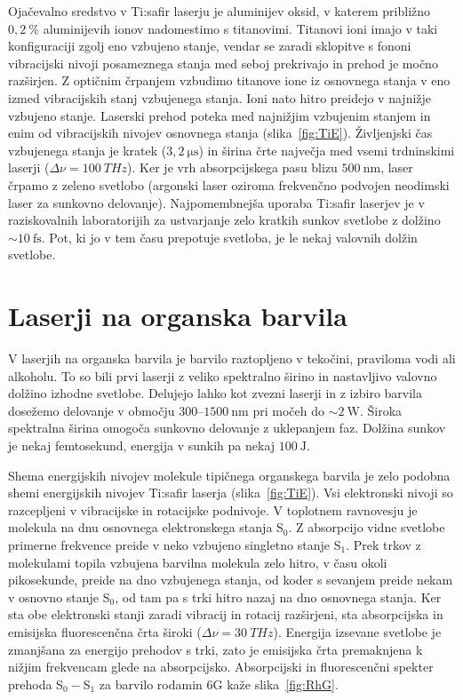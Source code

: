 Ojačevalno sredstvo v Ti:safir laserju je aluminijev oksid, v katerem 
približno $0,2~\%$ aluminijevih ionov nadomestimo s titanovimi. Titanovi ioni imajo 
v taki konfiguraciji zgolj eno vzbujeno stanje, vendar se zaradi sklopitve s fononi
vibracijski nivoji posameznega stanja med seboj prekrivajo in prehod je močno razširjen. 
Z optičnim črpanjem vzbudimo titanove ione iz osnovnega stanja v eno izmed vibracijskih 
stanj vzbujenega stanja. Ioni nato hitro preidejo v najnižje vzbujeno stanje. 
Laserski prehod poteka med najnižjim vzbujenim stanjem in enim od vibracijskih 
nivojev osnovnega stanja (slika~\ref{fig:TiE}). Življenjski čas
vzbujenega stanja je kratek ($3,2~\si{\micro\second}$) in širina črte največja med
vsemi trdninskimi laserji ($\Delta \nu =  100~\si{THz}$). 
Ker je vrh absorpcijskega pasu blizu $500~\si{\nano\metre}$,
laser črpamo z zeleno svetlobo (argonski laser oziroma
frekvenčno podvojen neodimski laser za sunkovno delovanje). 
Najpomembnejša uporaba Ti:safir laserjev je v raziskovalnih laboratorijih za ustvarjanje zelo 
kratkih sunkov svetlobe z dolžino $\sim 10~\si{\femto\second}$. Pot, ki jo 
v tem času prepotuje svetloba, je le nekaj valovnih dolžin svetlobe. 

\section{Laserji na organska barvila}
V laserjih na organska barvila je barvilo raztopljeno v tekočini, praviloma vodi ali alkoholu. 
To so bili prvi laserji z veliko spektralno širino in nastavljivo valovno dolžino
izhodne svetlobe. Delujejo lahko kot zvezni laserji in z izbiro barvila dosežemo
delovanje v območju $300$--$1500~\si{\nano\metre}$ pri močeh do $\sim 2~\si{\watt}$.
Široka spektralna širina omogoča sunkovno delovanje z uklepanjem faz. Dolžina 
sunkov je nekaj femtosekund, energija v sunkih pa nekaj $100~\si{\joule}$.

Shema energijskih nivojev molekule tipičnega organskega barvila
je zelo podobna shemi energijskih nivojev Ti:safir laserja (slika~\ref{fig:TiE}).
Vsi elektronski nivoji so razcepljeni v vibracijske in rotacijske podnivoje. 
V toplotnem ravnovesju je molekula na dnu osnovnega elektronskega stanja S$_0$. 
Z absorpcijo vidne svetlobe primerne frekvence preide v neko vzbujeno
singletno stanje S$_1$. Prek trkov z molekulami topila vzbujena barvilna molekula
zelo hitro, v času okoli pikosekunde, preide na dno vzbujenega stanja, od
koder s sevanjem preide nekam v osnovno stanje S$_0$, od tam pa s trki
hitro nazaj na dno osnovnega stanja. Ker
sta obe elektronski stanji zaradi vibracij in rotacij razširjeni, sta 
absorpcijska in emisijska fluorescenčna črta široki ($\Delta \nu = 30~\si{THz}$).
Energija izsevane svetlobe je zmanjšana za energijo
prehodov s trki, zato je emisijska črta premaknjena k nižjim
frekvencam glede na absorpcijsko. Absorpcijski in fluorescenčni 
spekter prehoda S$_0-$S$_1$
za barvilo rodamin 6G kaže slika~\ref{fig:RhG}.

